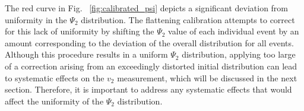 
The red curve in Fig. ~\ref{fig:calibrated_psi} depicts a significant deviation from uniformity in the $\Psi_2$ distribution. The flattening calibration attempts to correct for this  lack of uniformity by shifting the $\Psi_2$ value of each individual event by an amount corresponding to the deviation of the overall distribution for all events. Although this procedure results in a uniform $\Psi_2$ distribution, applying too large of a correction arising from an exceedingly distorted initial distribution can lead to systematic effects on the $v_2$ measurement, which will be discussed in the next section. Therefore, it is important to address any systematic effects that would affect the uniformity of the $\Psi_2$ distribution.
